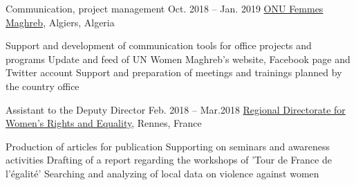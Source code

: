 \begin{joblist}[13.2][7.8][3.4]
\item[Communication, project management]{Oct. 2018 -- Jan. 2019 }     
	{
	\href{http://maghreb.unwomen.org/fr}{ONU Femmes Maghreb}, Algiers, Algeria
	}     
	{
			 
		\vspace{-0.5cm}
		\begin{itemize}
			  \iftbftiny \setlength\itemsep{-3pt} \fi
			  \cvitem[\checkmark] Support and development of communication tools for office projects and programs     
 			  \cvitem[\checkmark] Update and feed of UN Women Maghreb's website, Facebook page and Twitter account                                                         
			  \cvitem[\checkmark] Support and preparation of meetings and trainings planned by the country office
		\end{itemize}      

	}

\item[Assistant to the Deputy Director]{Feb. 2018 -- Mar.2018 }     
  	{
	\href{https://www.egalite-femmes-hommes.gouv.fr/le-secretariat-d-etat/organisation-du-ministere/services-territoriaux/annuaire-des-equipes-regionales-et-departementales/}{Regional Directorate for Women's Rights and Equality}, Rennes, France
	}      
  	{
        \vspace{-0.5cm}
		\iftbftiny \setlength{\parskip}{-10pt} \fi
		\begin{itemize}
			  \iftbftiny \setlength\itemsep{-3pt} \fi
			  \cvitem[\checkmark] Production of articles for publication
			  \cvitem[\checkmark] Supporting on seminars and awareness activities
			  \cvitem[\checkmark] Drafting of a report regarding the workshops of 'Tour de France de l'égalité'
			  \cvitem[\checkmark] Searching and analyzing of local data on violence against women
		\end{itemize}       
	}



\end{joblist}
